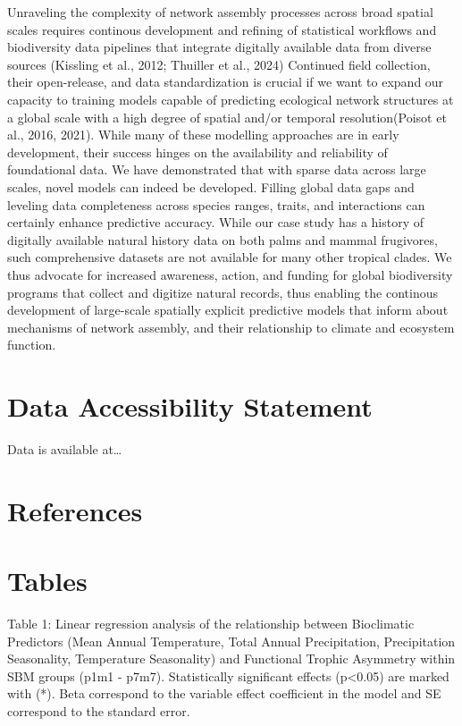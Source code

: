 \documentclass[
]{agujournal2019}
\begin{document}
Unraveling the complexity of network assembly processes across broad
spatial scales requires continous development and refining of
statistical workflows and biodiversity data pipelines that integrate
digitally available data from diverse sources (Kissling et al., 2012;
Thuiller et al., 2024) Continued field collection, their open-release,
and data standardization is crucial if we want to expand our capacity to
training models capable of predicting ecological network structures at a
global scale with a high degree of spatial and/or temporal
resolution(Poisot et al., 2016, 2021). While many of these modelling
approaches are in early development, their success hinges on the
availability and reliability of foundational data. We have demonstrated
that with sparse data across large scales, novel models can indeed be
developed. Filling global data gaps and leveling data completeness
across species ranges, traits, and interactions can certainly enhance
predictive accuracy. While our case study has a history of digitally
available natural history data on both palms and mammal frugivores, such
comprehensive datasets are not available for many other tropical clades.
We thus advocate for increased awareness, action, and funding for global
biodiversity programs that collect and digitize natural records, thus
enabling the continous development of large-scale spatially explicit
predictive models that inform about mechanisms of network assembly, and
their relationship to climate and ecosystem function.

\section{Data Accessibility
Statement}\label{data-accessibility-statement}

Data is available at\ldots{}

\section{References}\label{references}

\section{Tables}\label{tables}

Table 1: Linear regression analysis of the relationship between
Bioclimatic Predictors (Mean Annual Temperature, Total Annual
Precipitation, Precipitation Seasonality, Temperature Seasonality) and
Functional Trophic Asymmetry within SBM groups (p1m1 - p7m7).
Statistically significant effects (p\textless0.05) are marked with (*).
Beta correspond to the variable effect coefficient in the model and SE
correspond to the standard error.
\end{document}
